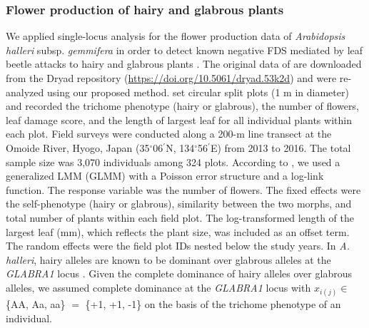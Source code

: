 \documentclass[12pt,]{article}
\begin{document}
\subsubsection{Flower production of hairy and glabrous plants}
We applied single-locus analysis for the flower production data of \textit{Arabidopsis halleri} subsp. \textit{gemmifera} in order to detect known negative FDS mediated by leaf beetle attacks to hairy and glabrous plants \citep{sato2017herbivore}. The original data of \cite{sato2017herbivore} are downloaded from the Dryad repository (\url{https://doi.org/10.5061/dryad.53k2d}) and were re-analyzed using our proposed method. \cite{sato2017herbivore} set circular split plots (1 m in diameter) and recorded the trichome phenotype (hairy or glabrous), the number of flowers, leaf damage score, and the length of largest leaf for all individual plants within each plot. Field surveys were conducted along a 200-m line transect at the Omoide River, Hyogo, Japan (35$^\circ$06$^\prime$N, 134$^\circ$56$^\prime$E) from 2013 to 2016. The total sample size was 3,070 individuals among 324 plots. According to \cite{sato2017herbivore}, we used a generalized LMM (GLMM) with a Poisson error structure and a log-link function. The response variable was the number of flowers. The fixed effects were the self-phenotype (hairy or glabrous), similarity between the two morphs, and total number of plants within each field plot. The log-transformed length of the largest leaf (mm), which reflects the plant size, was included as an offset term. The random effects were the field plot IDs nested below the study years. In \textit{A. halleri}, hairy alleles are known to be dominant over glabrous alleles at the \textit{GLABRA1} locus \citep{shimizu2002ecology, kawagoe2011coexistence}. Given the complete dominance of hairy alleles over glabrous alleles, we assumed complete dominance at the \textit{GLABRA1} locus with $x_{i(j)} \in$ \{AA, Aa, aa\} $=$ \{+1, +1, -1\} on the basis of the trichome phenotype of an individual.
\end{document}
